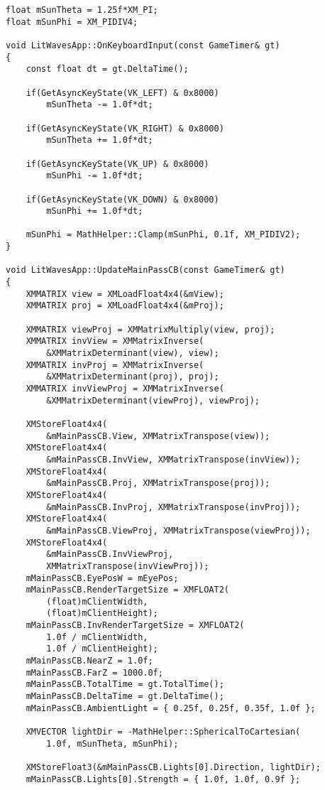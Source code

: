 \begin{lstlisting}
float mSunTheta = 1.25f*XM_PI;
float mSunPhi = XM_PIDIV4;

void LitWavesApp::OnKeyboardInput(const GameTimer& gt)
{
    const float dt = gt.DeltaTime();

    if(GetAsyncKeyState(VK_LEFT) & 0x8000)
        mSunTheta -= 1.0f*dt;

    if(GetAsyncKeyState(VK_RIGHT) & 0x8000)
        mSunTheta += 1.0f*dt;

    if(GetAsyncKeyState(VK_UP) & 0x8000)
        mSunPhi -= 1.0f*dt;

    if(GetAsyncKeyState(VK_DOWN) & 0x8000)
        mSunPhi += 1.0f*dt;

    mSunPhi = MathHelper::Clamp(mSunPhi, 0.1f, XM_PIDIV2);
}

void LitWavesApp::UpdateMainPassCB(const GameTimer& gt)
{
    XMMATRIX view = XMLoadFloat4x4(&mView);
    XMMATRIX proj = XMLoadFloat4x4(&mProj);

    XMMATRIX viewProj = XMMatrixMultiply(view, proj);
    XMMATRIX invView = XMMatrixInverse(
        &XMMatrixDeterminant(view), view);
    XMMATRIX invProj = XMMatrixInverse(
        &XMMatrixDeterminant(proj), proj);
    XMMATRIX invViewProj = XMMatrixInverse(
        &XMMatrixDeterminant(viewProj), viewProj);

    XMStoreFloat4x4(
        &mMainPassCB.View, XMMatrixTranspose(view));
    XMStoreFloat4x4(
        &mMainPassCB.InvView, XMMatrixTranspose(invView));
    XMStoreFloat4x4(
        &mMainPassCB.Proj, XMMatrixTranspose(proj));
    XMStoreFloat4x4(
        &mMainPassCB.InvProj, XMMatrixTranspose(invProj));
    XMStoreFloat4x4(
        &mMainPassCB.ViewProj, XMMatrixTranspose(viewProj));
    XMStoreFloat4x4(
        &mMainPassCB.InvViewProj, 
        XMMatrixTranspose(invViewProj));
    mMainPassCB.EyePosW = mEyePos;
    mMainPassCB.RenderTargetSize = XMFLOAT2(
        (float)mClientWidth, 
        (float)mClientHeight);
    mMainPassCB.InvRenderTargetSize = XMFLOAT2(
        1.0f / mClientWidth, 
        1.0f / mClientHeight);
    mMainPassCB.NearZ = 1.0f;
    mMainPassCB.FarZ = 1000.0f;
    mMainPassCB.TotalTime = gt.TotalTime();
    mMainPassCB.DeltaTime = gt.DeltaTime();
    mMainPassCB.AmbientLight = { 0.25f, 0.25f, 0.35f, 1.0f };

    XMVECTOR lightDir = -MathHelper::SphericalToCartesian(
        1.0f, mSunTheta, mSunPhi);

    XMStoreFloat3(&mMainPassCB.Lights[0].Direction, lightDir);
    mMainPassCB.Lights[0].Strength = { 1.0f, 1.0f, 0.9f };


\end{lstlisting}

